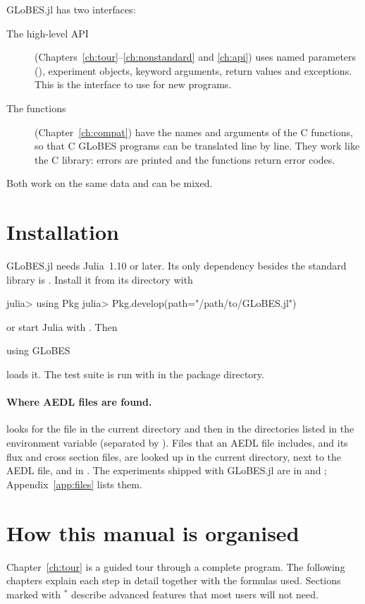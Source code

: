 GLoBES.jl has two interfaces:
\begin{description}
  \item[The high-level API] (Chapters~\ref{ch:tour}--\ref{ch:nonstandard} and
    \ref{ch:api}) uses named parameters (),
    experiment objects, keyword arguments, return values and exceptions. This
    is the interface to use for new programs.
  \item[The  functions] (Chapter~\ref{ch:compat}) have the names and
    arguments of the C functions, so that C GLoBES programs can be translated
    line by line. They work like the C library: errors are printed and the
    functions return error codes.
\end{description}
Both work on the same data and can be mixed.

\section{Installation}

GLoBES.jl needs Julia~1.10 or later. Its only dependency besides the standard
library is . Install it from its directory with
\begin{julia}
julia> using Pkg
julia> Pkg.develop(path="/path/to/GLoBES.jl")
\end{julia}
or start Julia with . Then
\begin{julia}
using GLoBES
\end{julia}
loads it. The test suite is run with 
in the package directory.

\paragraph{Where AEDL files are found.}  looks for
the file in the current directory and then in the directories listed in the
environment variable  (separated by \code{:}). Files that an AEDL
file includes, and its flux and cross section files, are looked up in the
current directory, next to the AEDL file, and in . The
experiments shipped with GLoBES.jl are in  and ;
Appendix~\ref{app:files} lists them.

\section{How this manual is organised}

Chapter~\ref{ch:tour} is a guided tour through a complete program. The
following chapters explain each step in detail together with the formulas
used. Sections marked with $^\ast$ describe advanced features that most users
will not need.
